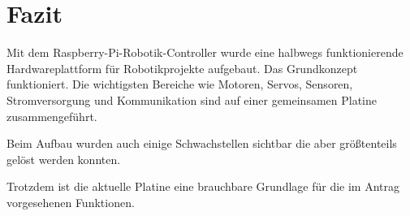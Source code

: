 \section{Fazit}
Mit dem Raspberry-Pi-Robotik-Controller wurde eine halbwegs funktionierende Hardwareplattform für Robotikprojekte aufgebaut. Das Grundkonzept funktioniert. Die wichtigsten Bereiche wie Motoren, Servos, Sensoren, Stromversorgung und Kommunikation sind auf einer gemeinsamen Platine zusammengeführt.

Beim Aufbau wurden auch einige Schwachstellen sichtbar die aber größtenteils gelöst werden konnten.

Trotzdem ist die aktuelle Platine eine brauchbare Grundlage für die im Antrag vorgesehenen Funktionen.
